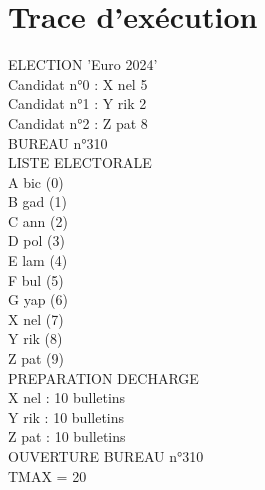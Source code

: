 \documentclass[12pt]{article} %
\begin{document}
\section*{Trace d'exécution}	
	\begin{multicols}{3}
		{\footnotesize
			\noindent
			ELECTION 'Euro 2024'\\
			\hspace*{6mm} Candidat n°0 : X nel 5\\
			\hspace*{6mm} Candidat n°1 : Y rik 2\\
			\hspace*{6mm} Candidat n°2 : Z pat 8\\
			
			\noindent BUREAU n°310\\
			LISTE ELECTORALE\\
			\hspace*{5mm} A bic (0)\\
			\hspace*{5mm} B gad (1)\\
			\hspace*{5mm} C ann (2)\\
			\hspace*{5mm} D pol (3)\\
			\hspace*{5mm} E lam (4)\\
			\hspace*{5mm} F bul (5)\\
			\hspace*{5mm} G yap (6)\\
			\hspace*{5mm} X nel (7)\\
			\hspace*{5mm} Y rik (8)\\
			\hspace*{5mm} Z pat (9)\\
			
			\noindent PREPARATION DECHARGE\\
			\hspace*{5mm} X nel : 10 bulletins\\
			\hspace*{5mm} Y rik : 10 bulletins\\
			\hspace*{5mm} Z pat : 10 bulletins\\
			
			\noindent OUVERTURE BUREAU n°310\\
			TMAX = 20\\
			
}
\end{multicols}
\end{document}

